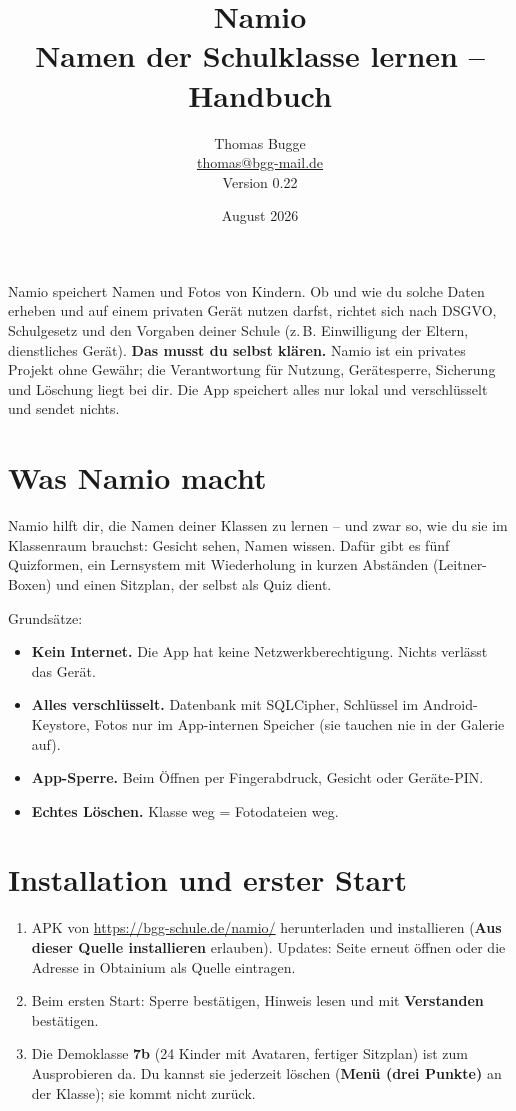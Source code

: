 \documentclass[11pt,a4paper]{article}
\title{\Huge Namio\\[6pt]\large Namen der Schulklasse lernen -- Handbuch}
\author{Thomas Bugge \\ \normalsize\href{mailto:thomas@bgg-mail.de}{thomas@bgg-mail.de} \\[4pt] \normalsize Version 0.22}
\date{August 2026}
\newcommand{\ui}[1]{\textbf{#1}}
\begin{document}
\maketitle

\begin{tcolorbox}[colback=red!5,colframe=red!60!black,title=Bitte zuerst lesen]
Namio speichert Namen und Fotos von Kindern. Ob und wie du solche Daten erheben und auf einem
privaten Gerät nutzen darfst, richtet sich nach DSGVO, Schulgesetz und den Vorgaben deiner Schule
(z.\,B. Einwilligung der Eltern, dienstliches Gerät). \textbf{Das musst du selbst klären.}
Namio ist ein privates Projekt ohne Gewähr; die Verantwortung für Nutzung, Gerätesperre, Sicherung
und Löschung liegt bei dir. Die App speichert alles nur lokal und verschlüsselt und sendet nichts.
\end{tcolorbox}

\tableofcontents
\newpage

\section{Was Namio macht}
Namio hilft dir, die Namen deiner Klassen zu lernen -- und zwar so, wie du sie im Klassenraum brauchst:
Gesicht sehen, Namen wissen. Dafür gibt es fünf Quizformen, ein Lernsystem mit Wiederholung in kurzen
Abständen (Leitner-Boxen) und einen Sitzplan, der selbst als Quiz dient.

Grundsätze:
\begin{itemize}[nosep]
  \item \textbf{Kein Internet.} Die App hat keine Netzwerkberechtigung. Nichts verlässt das Gerät.
  \item \textbf{Alles verschlüsselt.} Datenbank mit SQLCipher, Schlüssel im Android-Keystore, Fotos nur im
        App-internen Speicher (sie tauchen nie in der Galerie auf).
  \item \textbf{App-Sperre.} Beim Öffnen per Fingerabdruck, Gesicht oder Geräte-PIN.
  \item \textbf{Echtes Löschen.} Klasse weg = Fotodateien weg.
\end{itemize}

\section{Installation und erster Start}
\begin{enumerate}[nosep]
  \item APK von \url{https://bgg-schule.de/namio/} herunterladen und installieren
        (\ui{Aus dieser Quelle installieren} erlauben). Updates: Seite erneut öffnen oder
        die Adresse in Obtainium als Quelle eintragen.
  \item Beim ersten Start: Sperre bestätigen, Hinweis lesen und mit \ui{Verstanden} bestätigen.
  \item Die Demoklasse \ui{7b} (24 Kinder mit Avataren, fertiger Sitzplan) ist zum Ausprobieren da.
        Du kannst sie jederzeit löschen (\ui{Menü (drei Punkte)} an der Klasse); sie kommt nicht zurück.
\end{enumerate}
\end{document}
